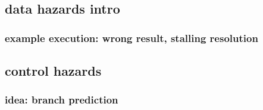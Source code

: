 \subsection{data hazards intro}

\subsubsection{example execution: wrong result, stalling resolution}


\subsection{control hazards}

\subsubsection{idea: branch prediction}





